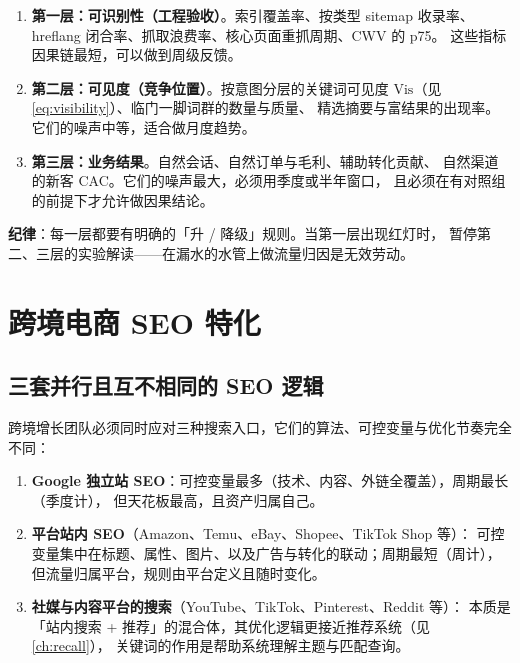 \begin{toolbox}
\begin{enumerate}
  \item \textbf{第一层：可识别性（工程验收）}。索引覆盖率、按类型 sitemap 收录率、
        hreflang 闭合率、抓取浪费率、核心页面重抓周期、CWV 的 p75。
        这些指标因果链最短，可以做到周级反馈。
  \item \textbf{第二层：可见度（竞争位置）}。按意图分层的关键词可见度
        $\text{Vis}$（见 \cref{eq:visibility}）、临门一脚词群的数量与质量、
        精选摘要与富结果的出现率。它们的噪声中等，适合做月度趋势。
  \item \textbf{第三层：业务结果}。自然会话、自然订单与毛利、辅助转化贡献、
        自然渠道的新客 CAC。它们的噪声最大，必须用季度或半年窗口，
        且必须在有对照组的前提下才允许做因果结论。
\end{enumerate}
\textbf{纪律}：每一层都要有明确的「升 / 降级」规则。当第一层出现红灯时，
暂停第二、三层的实验解读——在漏水的水管上做流量归因是无效劳动。
\end{toolbox}

\section{跨境电商 SEO 特化}
\label{sec:seo-cbec}

\subsection{三套并行且互不相同的 SEO 逻辑}

跨境增长团队必须同时应对三种搜索入口，它们的算法、可控变量与优化节奏完全不同：

\begin{enumerate}
  \item \textbf{Google 独立站 SEO}：可控变量最多（技术、内容、外链全覆盖），周期最长（季度计），
        但天花板最高，且资产归属自己。
  \item \textbf{平台站内 SEO}（Amazon、Temu、eBay、Shopee、TikTok Shop 等）：
        可控变量集中在标题、属性、图片、以及广告与转化的联动；周期最短（周计），
        但流量归属平台，规则由平台定义且随时变化。
  \item \textbf{社媒与内容平台的搜索}（YouTube、TikTok、Pinterest、Reddit 等）：
        本质是「站内搜索 + 推荐」的混合体，其优化逻辑更接近推荐系统（见 \cref{ch:recall}），
        关键词的作用是帮助系统理解主题与匹配查询。
\end{enumerate}

